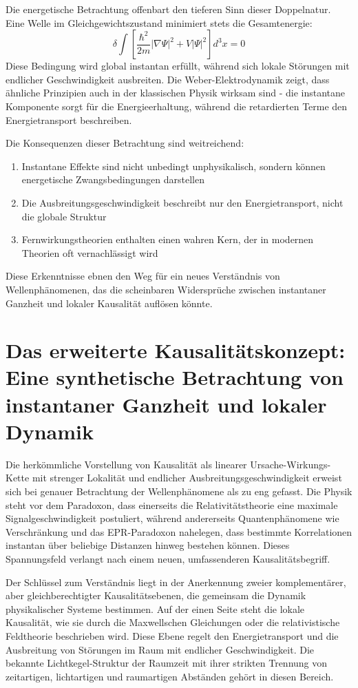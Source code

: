 Die energetische Betrachtung offenbart den tieferen Sinn dieser Doppelnatur. Eine Welle im Gleichgewichtszustand minimiert stets die Gesamtenergie:
\[
    \delta \int \left[\frac{\hbar^2}{2m}|\nabla\Psi|^2 + V|\Psi|^2\right] d^3x = 0
\]
Diese Bedingung wird global instantan erfüllt, während sich lokale Störungen mit endlicher Geschwindigkeit ausbreiten. Die Weber-Elektrodynamik zeigt, dass ähnliche Prinzipien auch in der
klassischen Physik wirksam sind - die instantane Komponente sorgt für die Energieerhaltung, während die retardierten Terme den Energietransport beschreiben.

Die Konsequenzen dieser Betrachtung sind weitreichend:
\begin{enumerate}
    \item Instantane Effekte sind nicht unbedingt unphysikalisch, sondern können energetische Zwangsbedingungen darstellen
    \item Die Ausbreitungsgeschwindigkeit beschreibt nur den Energietransport, nicht die globale Struktur
    \item Fernwirkungstheorien enthalten einen wahren Kern, der in modernen Theorien oft vernachlässigt wird
\end{enumerate}
Diese Erkenntnisse ebnen den Weg für ein neues Verständnis von Wellenphänomenen, das die scheinbaren Widersprüche zwischen instantaner Ganzheit und lokaler Kausalität auflösen könnte.

\section{Das erweiterte Kausalitätskonzept: Eine synthetische Betrachtung von instantaner Ganzheit und lokaler Dynamik}
Die herkömmliche Vorstellung von Kausalität als linearer Ursache-Wirkungs-Kette mit strenger Lokalität und endlicher Ausbreitungsgeschwindigkeit erweist sich bei genauer Betrachtung
der Wellenphänomene als zu eng gefasst. Die Physik steht vor dem Paradoxon, dass einerseits die Relativitätstheorie eine maximale Signalgeschwindigkeit postuliert, während andererseits
Quantenphänomene wie Verschränkung und das EPR-Paradoxon nahelegen, dass bestimmte Korrelationen instantan über beliebige Distanzen hinweg bestehen können. Dieses Spannungsfeld verlangt
nach einem neuen, umfassenderen Kausalitätsbegriff.

Der Schlüssel zum Verständnis liegt in der Anerkennung zweier komplementärer, aber gleichberechtigter Kausalitätsebenen, die gemeinsam die Dynamik physikalischer Systeme bestimmen.
Auf der einen Seite steht die lokale Kausalität, wie sie durch die Maxwellschen Gleichungen oder die relativistische Feldtheorie beschrieben wird. Diese Ebene regelt den Energietransport
und die Ausbreitung von Störungen im Raum mit endlicher Geschwindigkeit. Die bekannte Lichtkegel-Struktur der Raumzeit mit ihrer strikten Trennung von zeitartigen, lichtartigen und
raumartigen Abständen gehört in diesen Bereich.


